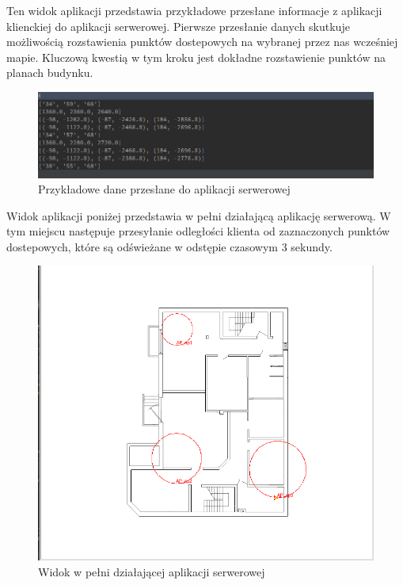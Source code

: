 \documentclass{article}
\begin{document}
\newpage
Ten widok aplikacji przedstawia przykładowe przesłane informacje z aplikacji klienckiej do aplikacji serwerowej. Pierwsze przesłanie danych skutkuje możliwością rozstawienia punktów dostepowych na wybranej przez nas wcześniej mapie. Kluczową kwestią w tym kroku jest dokładne rozstawienie punktów na planach budynku.

\begin{figure}[H]
	\centering
	\includegraphics[width=15cm]{serwerDane.png}
	\caption{Przykładowe dane przesłane do aplikacji serwerowej}
	\label{fig:rysowanie.jpg}
\end{figure}
\newpage
Widok aplikacji poniżej przedstawia w pełni działającą aplikację serwerową. W tym miejscu następuje przesyłanie odległości klienta od zaznaczonych punktów dostepowych, które są odświeżane w odstępie czasowym 3 sekundy.
\begin{figure}[H]
	\centering
	\includegraphics[width=15cm]{serwerKolo.png}
	\caption{Widok w pełni działającej aplikacji serwerowej}
	\label{fig:rysowanie.jpg}
\end{figure}
\newpage
\end{document}
